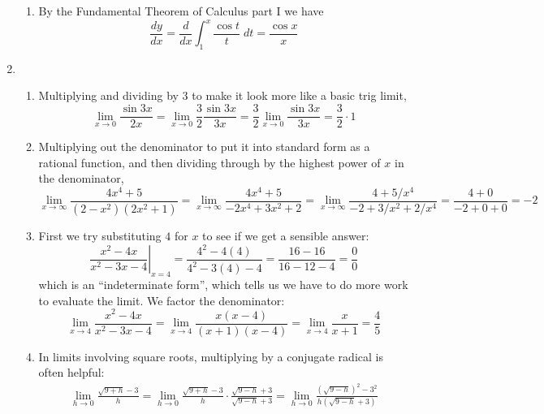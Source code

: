 \documentclass{article}
\begin{document}
\begin{enumerate}
\begin{enumerate}
  \item %
    By the Fundamental Theorem of Calculus part I we have
    \begin{equation*}
      \frac{dy}{dx} = \frac{d}{dx} \int_1^x \frac{\cos t}{t} \; dt
      = \frac{\cos x}{x}
    \end{equation*}
  \end{enumerate}
\item %
  \begin{enumerate}
  \item %
    Multiplying and dividing by $3$ to make it look more like a basic trig
    limit,
    \begin{equation*}
      \lim_{x\to 0} \frac{\sin 3x}{2x}
      = \lim_{x\to 0} \frac{3}{2} \frac{\sin 3x}{3x}
      = \frac{3}{2} \lim_{x\to 0} \frac{\sin 3x}{3x}
      = \frac{3}{2} \cdot 1
    \end{equation*}
  \item %
    Multiplying out the denominator to put it into standard form as a rational
    function, and then dividing through by the highest power of $x$ in the
    denominator,
    \begin{equation*}
      \lim_{x\to\infty} \frac{4x^4+5}{(2-x^2)(2x^2+1)}
      = \lim_{x\to\infty} \frac{4x^4+5}{-2x^4+3x^2+2}
      = \lim_{x\to\infty} \frac{4+5/x^4}{-2+3/x^2+2/x^4}
      = \frac{4+0}{-2+0+0}
      = -2
    \end{equation*}
  \item %
    First we try substituting $4$ for $x$ to see if we get a sensible answer:
    \begin{equation*}
      \left. \frac{x^2-4x}{x^2-3x-4} \right|_{x=4}
      = \frac{4^2-4(4)}{4^2-3(4)-4} = \frac{16-16}{16-12-4} = \frac{0}{0}
    \end{equation*}
    which is an ``indeterminate form'', which tells us we have to do more
    work to evaluate the limit.  We factor the denominator:
    \begin{equation*}
      \lim_{x\to 4} \frac{x^2-4x}{x^2-3x-4}
      = \lim_{x\to 4} \frac{x(x-4)}{(x+1)(x-4)}
      = \lim_{x\to 4} \frac{x}{x+1}
      = \frac{4}{5}
    \end{equation*}
  \item %
    In limits involving square roots, multiplying by a conjugate radical is 
    often helpful:
    \begin{multline*}
      \lim_{h\to 0} \frac{\sqrt{9+h}-3}{h}
      = \lim_{h\to 0} \frac{\sqrt{9+h}-3}{h} \cdot 
      \frac{\sqrt{9-h}+3}{\sqrt{9-h}+3}
      = \lim_{h\to 0} \frac{(\sqrt{9-h})^2-3^2}{h(\sqrt{9-h}+3)}

\end{multline*}
\end{enumerate}
\end{enumerate}
\end{document}
